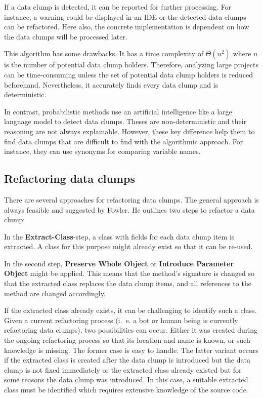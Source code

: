 If a data clump is detected, it can be reported for further processing. For instance, a warning could be displayed in an \ac{IDE} or the detected data clumps can be refactored. Here also, the concrete implementation is dependent on how the data clumps will be processed later.

This algorithm has some drawbacks. It has a time complexity of $\Theta(n^2)$ where $n$ is the number of potential data clump holders. Therefore, analyzing  large projects can be time-consuming unless the set of potential data clump holders is reduced beforehand. Nevertheless, it accurately finds every data clump and is deterministic.

In contrast, probabilistic methods use an artificial intelligence like a large language model to detect data clumps. Theses are non-deterministic and their reasoning are not always explainable. However,  these key difference help them to find data clumps that are difficult to find with the algorithmic approach. For instance, they can use synonyms for comparing variable names. 
  
\subsection{Refactoring data clumps}\label{sec:data_clump_refactor}

There are several approaches for refactoring data clumps. The general approach is always feasible and suggested by Fowler.
He outlines two  steps to refactor a data clump:

In the  \textbf{Extract-Class}-step, a class with fields for each data clump item is extracted. A class for this purpose might already exist so that it can be re-used.

In the second step, \textbf{Preserve Whole Object} or \textbf{Introduce Parameter Object} might be applied. This means that the method's signature is changed so that the extracted class replaces the data clump items, and all references to the method are changed accordingly.

If the extracted class already exists, it can be challenging to identify such a class. Given a current refactoring process (i.~e. a bot or human being is currently refactoring data clumps), two possibilities can occur. Either it was created during the ongoing refactoring process so that its location and name is known, or such knowledge is missing. The former case is easy to handle.  The latter variant occurs if the extracted class is created after the data clump is introduced but the data clump is not fixed immediately or the extracted class already existed but for some reasons the data clump was introduced. In this case, a suitable extracted class must be identified which requires extensive knowledge of the source code.

